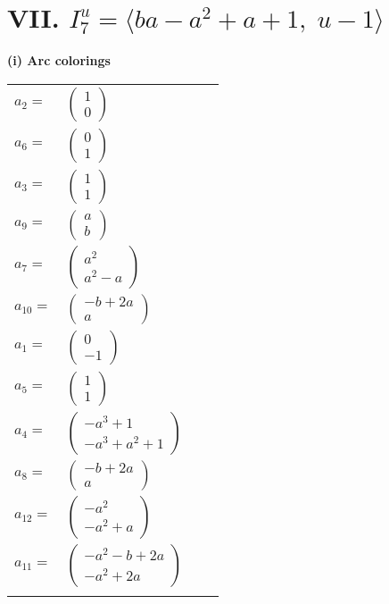 \documentclass[1p]{elsarticle_modified}
\theoremstyle{definition}
\begin{document}
\centering \section*{VII. $I^u_{7}= \langle b a- a^2+a+1,\;u-1 \rangle$}
\flushleft \textbf{(i) Arc colorings}\\
\begin{tabular}{m{7pt} m{180pt} m{7pt} m{180pt} }
\flushright $a_{2}=$&$\begin{pmatrix}1\\0\end{pmatrix}$ \\
\flushright $a_{6}=$&$\begin{pmatrix}0\\1\end{pmatrix}$ \\
\flushright $a_{3}=$&$\begin{pmatrix}1\\1\end{pmatrix}$ \\
\flushright $a_{9}=$&$\begin{pmatrix}a\\b\end{pmatrix}$ \\
\flushright $a_{7}=$&$\begin{pmatrix}a^2\\a^2- a\end{pmatrix}$ \\
\flushright $a_{10}=$&$\begin{pmatrix}- b+2 a\\a\end{pmatrix}$ \\
\flushright $a_{1}=$&$\begin{pmatrix}0\\-1\end{pmatrix}$ \\
\flushright $a_{5}=$&$\begin{pmatrix}1\\1\end{pmatrix}$ \\
\flushright $a_{4}=$&$\begin{pmatrix}- a^3+1\\- a^3+a^2+1\end{pmatrix}$ \\
\flushright $a_{8}=$&$\begin{pmatrix}- b+2 a\\a\end{pmatrix}$ \\
\flushright $a_{12}=$&$\begin{pmatrix}- a^2\\- a^2+a\end{pmatrix}$ \\
\flushright $a_{11}=$&$\begin{pmatrix}- a^2- b+2 a\\- a^2+2 a\end{pmatrix}$\\&\end{tabular}
\end{document}
